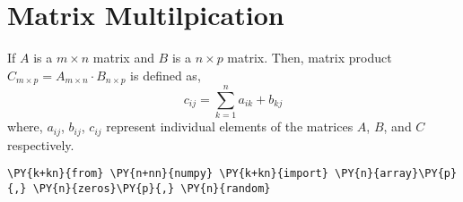     \hypertarget{matrix-multilpication}{%
\section{Matrix Multilpication}\label{matrix-multilpication}}

    If \(A\) is a \(m \times n\) matrix and \(B\) is a \(n \times p\)
matrix. Then, matrix product
\(C_{m \times p} = A_{m \times n} \cdot B_{n \times p}\) is defined as,
\[c_{ij} = \sum_{k=1}^n a_{ik} + b_{kj}\] where, \(a_{ij}\), \(b_{ij}\),
\(c_{ij}\) represent individual elements of the matrices \(A\), \(B\),
and \(C\) respectively.

    \begin{tcolorbox}[breakable, size=fbox, boxrule=1pt, pad at break*=1mm,colback=cellbackground, colframe=cellborder]
\begin{Verbatim}[commandchars=\\\{\}]
\PY{k+kn}{from} \PY{n+nn}{numpy} \PY{k+kn}{import} \PY{n}{array}\PY{p}{,} \PY{n}{zeros}\PY{p}{,} \PY{n}{random}
\end{Verbatim}
\end{tcolorbox}

